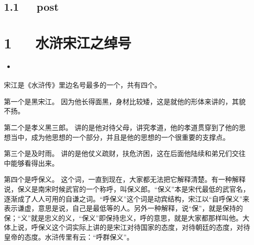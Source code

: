 \documentclass[letterpaper,12pt,english]{sphinxmanual}
\begin{document}
\section{1.1   post}
\label{\detokenize{p02_u8bfb_u4e66/Hello_uff0cp02_u8bfb_u4e66:post}}

\chapter{1   水浒\sphinxhyphen{}宋江之绰号}
\label{\detokenize{p02_u8bfb_u4e66/_u6c34_u6d52-_u5b8b_u6c5f_u4e4b_u7ef0_u53f7:id1}}\label{\detokenize{p02_u8bfb_u4e66/_u6c34_u6d52-_u5b8b_u6c5f_u4e4b_u7ef0_u53f7::doc}}
\begin{sphinxShadowBox}
\begin{itemize}
\item {} 
\label{\detokenize{p02_u8bfb_u4e66/_u6c34_u6d52-_u5b8b_u6c5f_u4e4b_u7ef0_u53f7:id3}}{\hyperref[\detokenize{p02_u8bfb_u4e66/_u6c34_u6d52-_u5b8b_u6c5f_u4e4b_u7ef0_u53f7:id1}]{}}

\end{itemize}
\end{sphinxShadowBox}

宋江是《水浒传》里边名号最多的一个，共有四个。

第一个是黑宋江。
因为他长得面黑，身材比较矮，这是就他的形体来讲的，其貌不扬。

第二个是孝义黑三郎。
讲的是他对待父母，讲究孝道，他的孝道贯穿到了他的思想当中，成为他思想的一个部分，并且是他的思想的一个很重要的支撑点。

第三个是及时雨。
讲的是他仗义疏财，扶危济困，这在后面他陆续和弟兄们交往中能够看得出来。

第四个是呼保义。
这个词，一直到现在，大家都无法把它解释清楚。有一种解释说，保义是南宋时候武官的一个称呼，叫保义郎。“保义”本是宋代最低的武官名，逐渐成了人人可用的自谦之词。“呼保义”这个词是动宾结构，宋江以“自呼保义”来表示谦虚，意思是说，自己是最低等的人。另外一种解释，说“保”，就是保持的保；“义”就是忠义的义，“保义”即保持忠义，呼的意思，就是大家都那样叫他。大体上说，呼保义这个词实际上讲的是宋江对待国家的态度，对待朝廷的态度，对待皇帝的态度。水浒传里有云：“呼群保义”。
\end{document}
